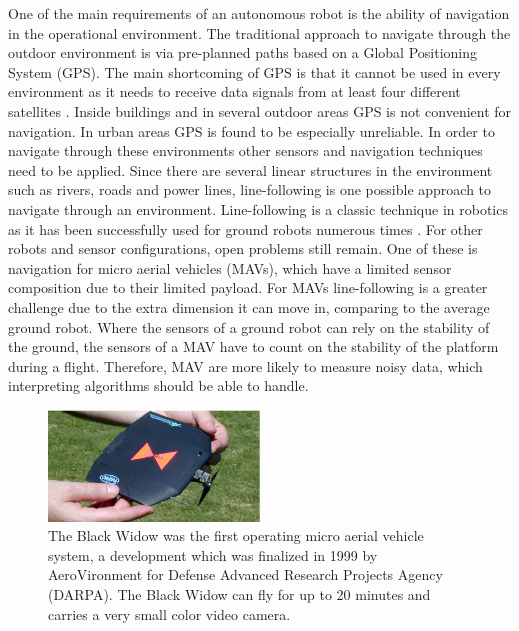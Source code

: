 \documentclass[a4paper]{article}
\begin{document}
One of the main requirements of an autonomous robot is the ability of navigation in the operational environment. The traditional approach to navigate through the outdoor environment is via pre-planned paths based on a Global Positioning System (GPS). The main shortcoming of GPS is that it cannot be used in every environment as it needs to receive data signals from at least four different satellites \cite{Bajaj2002}. Inside buildings and in several outdoor areas GPS is not convenient for navigation. In urban areas GPS is found to be especially unreliable. In order to navigate through these environments other sensors and navigation techniques need to be applied. Since there are several linear structures in the environment such as rivers, roads and power lines, line-following is one possible approach to navigate through an environment. Line-following is a classic technique in robotics as it has been successfully used for ground robots numerous times \cite{Sampei1995, Dupuis2006}. For other robots and sensor configurations, open problems still remain. One of these is navigation for micro aerial vehicles (MAVs), which have a limited sensor composition due to their limited payload. For MAVs line-following is a greater challenge due to the extra dimension it can move in, comparing to the average ground robot. Where the sensors of a ground robot can rely on the stability of the ground, the sensors of a MAV have to count on the stability of the platform during a flight. Therefore, MAV are more likely to measure noisy data, which interpreting algorithms should be able to handle.

\begin{figure}[!ht]
	\centering
	\includegraphics[width=0.5\textwidth]{images/blackwidow.eps}
	\caption{The Black Widow \cite{Grasmeyer2001} was the first operating micro aerial vehicle system, a development which was finalized in 1999 by AeroVironment for Defense Advanced Research Projects Agency (DARPA). The Black Widow can fly for up to 20 minutes and carries a very small color video camera.}
	\label{blackwidow}
\end{figure}
\end{document}

